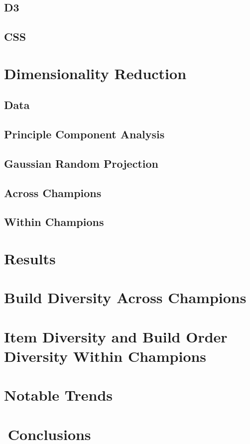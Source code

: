 \documentclass[11pt]{amsart}
\begin{document}
\subsection{D3}
\subsection{CSS}

\section{Dimensionality Reduction}
\subsection{Data}
\subsection{Principle Component Analysis}
\subsection{Gaussian Random Projection}
\subsection{Across Champions}
\subsection{Within Champions}


\section{Results}
\section{Build Diversity Across Champions}
\section{Item Diversity and Build Order Diversity Within Champions}
\section{Notable Trends}

\section{Conclusions}


\subsection{}
\end{document}
